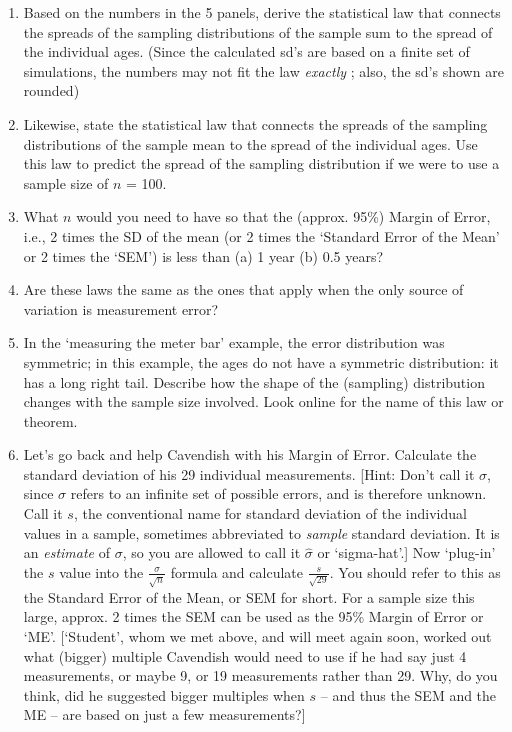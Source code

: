 \documentclass[
]{article}
\begin{document}
\begin{enumerate}
\def\labelenumi{\arabic{enumi}.}
\item
  Based on the numbers in the 5 panels, derive the statistical law that
  connects the spreads of the sampling distributions of the sample sum
  to the spread of the individual ages. (Since the calculated sd's are
  based on a finite set of simulations, the numbers may not fit the law
  \emph{exactly} ; also, the sd's shown are rounded)
\item
  Likewise, state the statistical law that connects the spreads of the
  sampling distributions of the sample mean to the spread of the
  individual ages. Use this law to predict the spread of the sampling
  distribution if we were to use a sample size of \(n\) = 100.
\item
  What \(n\) would you need to have so that the (approx. 95\%) Margin of
  Error, i.e., 2 times the SD of the mean (or 2 times the `Standard
  Error of the Mean' or 2 times the `SEM') is less than (a) 1 year (b)
  0.5 years?
\item
  Are these laws the same as the ones that apply when the only source of
  variation is measurement error?
\item
  In the `measuring the meter bar' example, the error distribution was
  symmetric; in this example, the ages do not have a symmetric
  distribution: it has a long right tail. Describe how the shape of the
  (sampling) distribution changes with the sample size involved. Look
  online for the name of this law or theorem.
\item
  Let's go back and help Cavendish with his Margin of Error. Calculate
  the standard deviation of his 29 individual measurements. {[}Hint:
  Don't call it \(\sigma\), since \(\sigma\) refers to an infinite set
  of possible errors, and is therefore unknown. Call it \(s\), the
  conventional name for standard deviation of the individual values in a
  sample, sometimes abbreviated to \emph{sample} standard deviation. It
  is an \emph{estimate} of \(\sigma\), so you are allowed to call it
  \(\hat{\sigma}\) or `sigma-hat'.{]} Now `plug-in' the \(s\) value into
  the \(\frac{\sigma}{\sqrt{n}}\) formula and calculate
  \(\frac{s}{\sqrt{29}}\). You should refer to this as the Standard
  Error of the Mean, or SEM for short. For a sample size this large,
  approx. 2 times the SEM can be used as the 95\% Margin of Error or
  `ME'. {[}`Student', whom we met above, and will meet again soon,
  worked out what (bigger) multiple Cavendish would need to use if he
  had say just 4 measurements, or maybe 9, or 19 measurements rather
  than 29. Why, do you think, did he suggested bigger multiples when
  \(s\) -- and thus the SEM and the ME -- are based on just a few
  measurements?{]}
\end{enumerate}
\end{document}
